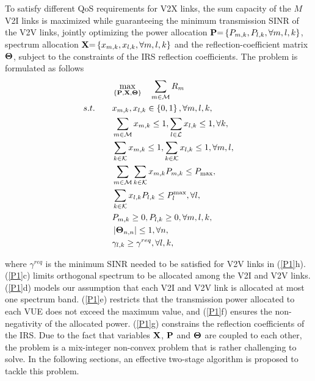 \documentclass[journal]{IEEEtran}
\begin{document}
To satisfy different QoS requirements for V2X links, the sum capacity of the $M$ V2I links is maximized while guaranteeing the minimum transmission SINR of the V2V links, jointly optimizing the power allocation ${\bf{P}}{\rm{ = }}\left\{ {{P_{m,k}},{P_{l,k}},\forall m,l,k} \right\}$, spectrum allocation ${\bf{X}}{\rm{ = }}\left\{ {{x_{m,k}},{x_{l,k}},\forall m,l,k} \right\}$ and the reflection-coefficient matrix $ {\bf{\Theta }} $, subject to the constraints of the IRS reflection coefficients. The problem is formulated as follows
\begin{subequations}\label{P1}
	\begin{align}
	&\mathop {\max }\limits_{\left\{ {{\bf{P}},{\bf{X}},{\bf{\Theta }}} \right\}} \quad \sum\limits_{m \in {\cal M}} {{R_m}} \\
	s.t.\qquad &{x_{m,k}},{x_{l,k}} \in \left\{ {0,1} \right\},\forall m,l,k,\\
		&\sum\limits_{m \in {\cal M}} {{x_{m,k}}}  \le 1,\sum\limits_{l \in {\cal L}} {{x_{l,k}}}  \le 1,\forall k,\\
		&\sum\limits_{k \in {\cal K}} {{x_{m,k}}}  \le 1,\sum\limits_{k \in {\cal K}} {{x_{l,k}}}  \le 1,\forall m,l,\\
	&\sum\limits_{m \in {\cal M}} {\sum\limits_{k \in {\cal K}} {{x_{m,k}}{P_{m,k}}} }  \le {P_{\max }},\nonumber\\
	&\sum\limits_{k \in {\cal K}} {{x_{l,k}}{P_{l,k}} \le P_l^{\max }} ,\forall l,\\
	&{P_{m,k}} \ge 0,{P_{l,k}} \ge 0,\forall m,l,k,\\
	&\left| {{{\bf{\Theta }}_{n,n}}} \right| \le 1,\forall n,\\
	&{\gamma _{l,k}} \ge {\gamma ^{req}},\forall l,k,
	\end{align}
\end{subequations}

\noindent where $ {\gamma ^{req}} $ is the minimum SINR needed to be satisfied for V2V links in (\ref{P1}h). (\ref{P1}c) limits orthogonal spectrum to be allocated among the V2I and V2V links. (\ref{P1}d) models our assumption that each V2I and V2V link is allocated at most one spectrum band. (\ref{P1}e) restricts that the transmission power allocated to each VUE does not exceed the maximum value, and (\ref{P1}f) ensures the non-negativity of the allocated power. (\ref{P1}g) constrains the reflection coefficients of the IRS. Due to the fact that variables ${\bf{X}}$, $ {\bf{P}} $ and ${\bf{\Theta }}$ are coupled to each other, the problem is a mix-integer non-convex problem that is rather challenging to solve. In the following sections, an effective two-stage algorithm is proposed to tackle this problem.
\end{document}
